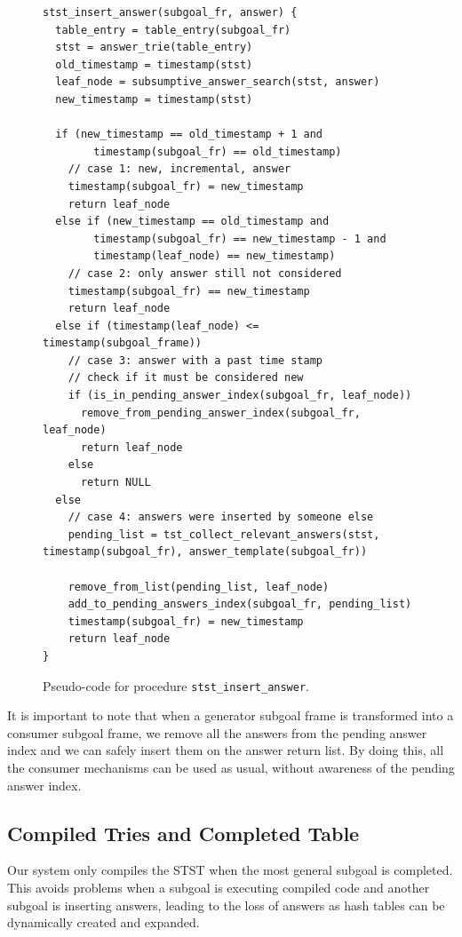 \begin{figure}[ht]
\begin{Verbatim}
stst_insert_answer(subgoal_fr, answer) {
  table_entry = table_entry(subgoal_fr)
  stst = answer_trie(table_entry)
  old_timestamp = timestamp(stst)
  leaf_node = subsumptive_answer_search(stst, answer)
  new_timestamp = timestamp(stst)
  
  if (new_timestamp == old_timestamp + 1 and
        timestamp(subgoal_fr) == old_timestamp)
    // case 1: new, incremental, answer
    timestamp(subgoal_fr) = new_timestamp
    return leaf_node
  else if (new_timestamp == old_timestamp and
        timestamp(subgoal_fr) == new_timestamp - 1 and
        timestamp(leaf_node) == new_timestamp)
    // case 2: only answer still not considered
    timestamp(subgoal_fr) == new_timestamp
    return leaf_node
  else if (timestamp(leaf_node) <= timestamp(subgoal_frame))
    // case 3: answer with a past time stamp
    // check if it must be considered new
    if (is_in_pending_answer_index(subgoal_fr, leaf_node))
      remove_from_pending_answer_index(subgoal_fr, leaf_node)   
      return leaf_node
    else
      return NULL
  else
    // case 4: answers were inserted by someone else
    pending_list = tst_collect_relevant_answers(stst, timestamp(subgoal_fr), answer_template(subgoal_fr))
    
    remove_from_list(pending_list, leaf_node)
    add_to_pending_answers_index(subgoal_fr, pending_list)
    timestamp(subgoal_fr) = new_timestamp
    return leaf_node
}
\end{Verbatim}
\caption{Pseudo-code for procedure \texttt{stst\_insert\_answer}.}
\label{fig:stst_insert_answer}
\end{figure}

It is important to note that when a generator subgoal frame is transformed into a
consumer subgoal frame, we remove all the answers from the pending answer index
and we can safely insert them on the answer return list. By doing this, all the consumer mechanisms
can be used as usual, without awareness of the pending answer index.

\subsection{Compiled Tries and Completed Table}

Our system only compiles the STST when the most general subgoal is completed.
This avoids problems when a subgoal is executing compiled code and another
subgoal is inserting answers, leading to the loss of answers as hash tables can be
dynamically created and expanded.

